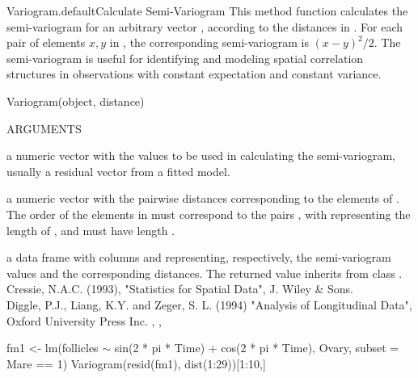 \documentclass[pdftex]{article} \usepackage{url,graphicx}
\renewcommand{\Twiddle}{\mbox{\(\sim\)}}
\begin{document}
\begin{Helpfile}{Variogram.default}{Calculate Semi-Variogram}
  This method function calculates the semi-variogram for an arbitrary
  vector , according to the distances in . For
  each pair of elements $x, y$ in , the corresponding
  semi-variogram is $(x-y)^2/2$.  The semi-variogram is useful for
  identifying and modeling spatial correlation structures in
  observations with constant expectation and constant variance.
\begin{Example}
Variogram(object, distance)
\end{Example}
\begin{Argument}{ARGUMENTS}
\item[\Co{object:}]
a numeric vector with the values to be used in
calculating the semi-variogram, usually a residual vector from a
fitted model.
\item[\Co{distance:}]
a numeric vector with the pairwise distances
corresponding to the elements of . The order of the
elements in  must correspond to the pairs
, with  representing the
length of , and must have length .
\end{Argument}
a data frame with columns  and  representing,
respectively, the semi-variogram values and the corresponding
distances. The returned value inherits from class .
Cressie, N.A.C. (1993), "Statistics for Spatial Data", J. Wiley \& Sons.\\
Diggle, P.J., Liang, K.Y. and Zeger, S. L. (1994) "Analysis of
Longitudinal Data", Oxford University Press Inc. 
, ,
\need 15pt
\vspace{-16pt}
\begin{Example}
fm1 <- lm(follicles {\Twiddle} sin(2 * pi * Time) + cos(2 * pi * Time), 
         Ovary, subset = Mare == 1)
Variogram(resid(fm1), dist(1:29))[1:10,]
\end{Example}
\end{Helpfile}
\end{document}

